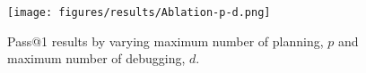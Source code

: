\begin{figure}[h]
    \centering
    \texttt{[image: figures/results/Ablation-p-d.png]}
    \caption{Pass@1 results by varying maximum number of planning, $p$ and maximum number of debugging, $d$.}
    \label{tab:ablation-p-d-results}
\end{figure}
